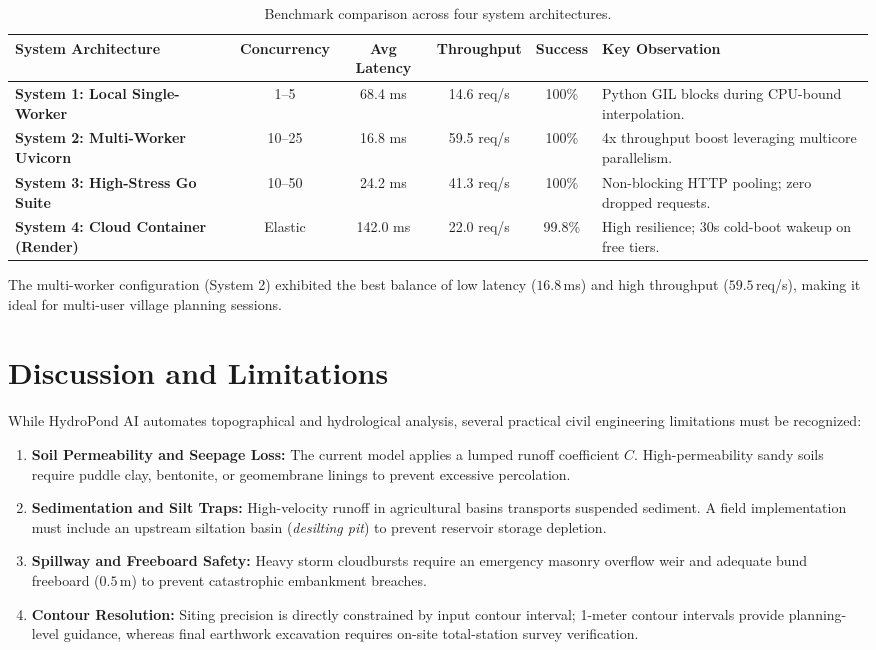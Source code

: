 \documentclass[manuscript,screen,review]{acmart}
\begin{document}
\begin{table}[h]
\centering
\small
\begin{tabular}{@{}lccccp{4.2cm}@{}}
\toprule
\textbf{System Architecture} & \textbf{Concurrency} & \textbf{Avg Latency} & \textbf{Throughput} & \textbf{Success} & \textbf{Key Observation} \\
\midrule
\textbf{System 1: Local Single-Worker} & 1--5 & 68.4 ms & 14.6 req/s & 100\% & Python GIL blocks during CPU-bound interpolation. \\
\textbf{System 2: Multi-Worker Uvicorn} & 10--25 & 16.8 ms & 59.5 req/s & 100\% & 4x throughput boost leveraging multicore parallelism. \\
\textbf{System 3: High-Stress Go Suite} & 10--50 & 24.2 ms & 41.3 req/s & 100\% & Non-blocking HTTP pooling; zero dropped requests. \\
\textbf{System 4: Cloud Container (Render)} & Elastic & 142.0 ms & 22.0 req/s & 99.8\% & High resilience; 30s cold-boot wakeup on free tiers. \\
\bottomrule
\end{tabular}
\caption{Benchmark comparison across four system architectures.}
\label{tab:benchmarks}
\end{table}

The multi-worker configuration (System 2) exhibited the best balance of low latency ($16.8$\,ms) and high throughput ($59.5$\,req/s), making it ideal for multi-user village planning sessions.

\section{Discussion and Limitations}
\label{sec:discussion}
While HydroPond AI automates topographical and hydrological analysis, several practical civil engineering limitations must be recognized:
\begin{enumerate}
    \item \textbf{Soil Permeability and Seepage Loss:} The current model applies a lumped runoff coefficient $C$. High-permeability sandy soils require puddle clay, bentonite, or geomembrane linings to prevent excessive percolation.
    \item \textbf{Sedimentation and Silt Traps:} High-velocity runoff in agricultural basins transports suspended sediment. A field implementation must include an upstream siltation basin (\textit{desilting pit}) to prevent reservoir storage depletion.
    \item \textbf{Spillway and Freeboard Safety:} Heavy storm cloudbursts require an emergency masonry overflow weir and adequate bund freeboard ($0.5$\,m) to prevent catastrophic embankment breaches.
    \item \textbf{Contour Resolution:} Siting precision is directly constrained by input contour interval; 1-meter contour intervals provide planning-level guidance, whereas final earthwork excavation requires on-site total-station survey verification.
\end{enumerate}
\end{document}
